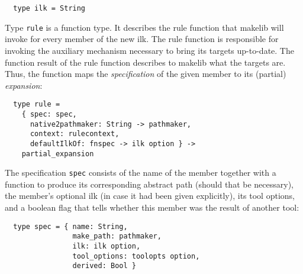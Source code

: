 \begin{verbatim}
  type ilk = String
\end{verbatim}

Type {\tt rule} is a function type.  It describes the rule function
that makelib will invoke for every member of the new ilk. The rule
function is responsible for invoking the auxiliary mechanism necessary
to bring its targets up-to-date.  The function result of the rule
function describes to makelib what the targets are.  Thus, the function
maps the {\em specification} of the given member to its (partial) {\em
expansion}:

\begin{verbatim}
  type rule =
    { spec: spec,
      native2pathmaker: String -> pathmaker,
      context: rulecontext,
      defaultIlkOf: fnspec -> ilk option } ->
    partial_expansion
\end{verbatim}

The specification {\tt spec} consists of the name of the member
together with a function to produce its corresponding abstract
path (should that be necessary), the member's optional ilk (in case
it had been given explicitly), its tool options, and a boolean flag
that tells whether this member was the result of another tool:

\begin{verbatim}
  type spec = { name: String,
                make_path: pathmaker,
                ilk: ilk option,
                tool_options: toolopts option,
                derived: Bool }
\end{verbatim}

